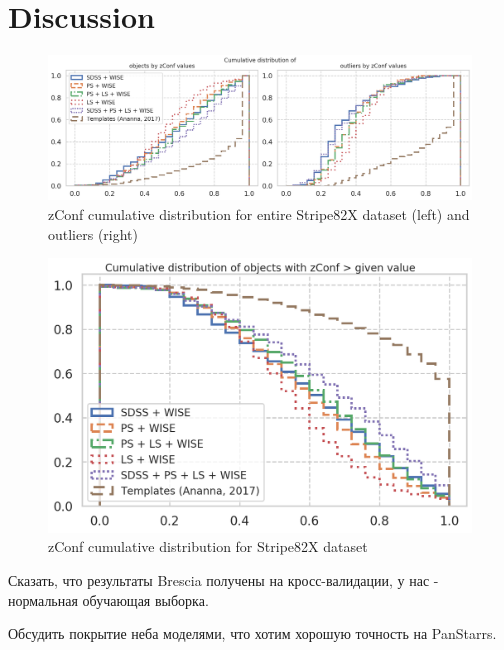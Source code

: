 \section{Discussion}\label{sec:discussion}

\begin{figure}
    \centering
    \includegraphics[width=\linewidth]{images/zconfs-s82x-a17.png}
    \caption{zConf cumulative distribution for entire Stripe82X dataset (left) and outliers (right)}
    \label{fig:zconfs-s82x-a17}
\end{figure}

\begin{figure}
    \centering
    \includegraphics[width=\linewidth]{images/zconfs2-s82x-a17.png}
    \caption{zConf cumulative distribution for Stripe82X dataset}
    \label{fig:zconfs2-s82x-a17}
\end{figure}

Сказать, что результаты Brescia получены на кросс-валидации, у нас - нормальная обучающая выборка.

Обсудить покрытие неба моделями, что хотим хорошую точность на PanStarrs.
